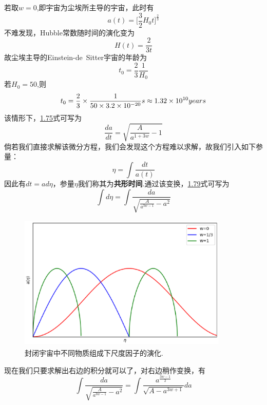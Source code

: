 \documentclass[a4paper]{book}
\begin{document}
若取$w=0$,即宇宙为尘埃所主导的宇宙，此时有
\begin{equation}
	a(t)=\Big[\frac{3}{2}H_0t\Big]^{\frac{2}{3}}
\end{equation} 
不难发现，Hubble常数随时间的演化变为
\begin{equation}
	H(t)=\frac{2}{3t}
\end{equation}
故尘埃主导的Einstein-de~Sitter宇宙的年龄为
\begin{equation}
	t_0=\frac{2}{3}\frac{1}{H_0}
\end{equation}
若$H_0=50$,则
\begin{equation}
	t_0=\frac{2}{3}\times\frac{1}{50\times3.2\times10^{-20}}s\approx1.32\times10^{10}years\notag
\end{equation}
该情形下，\hyperref[1.75]{1.75}式可写为
\begin{equation}\label{1.79}
	\frac{da}{dt}=\sqrt{\frac{A}{a^{1+3w}}-1}
\end{equation}
倘若我们直接求解该微分方程，我们会发现这个方程难以求解，故我们引入如下参量：
\begin{equation}
	\eta =\int\frac{dt}{a(t)}
\end{equation}
因此有$dt=ad\eta$，参量$\eta$我们称其为\textbf{共形时间}.通过该变换，\hyperref[1.79]{1.79}式可写为
\begin{equation}
	\int d\eta=\int\frac{da}{\sqrt{\frac{A}{a^{3w-1}}-a^2}}
\end{equation}
\begin{figure}[!h]
	\centering
	\includegraphics[width=10cm,height=6.5cm]{figures/k=1.eps}
	\caption{封闭宇宙中不同物质组成下尺度因子的演化.}
\end{figure}
现在我们只要求解出右边的积分就可以了，对右边稍作变换，有
\begin{equation}
\int\frac{da}{\sqrt{\frac{A}{a^{3w-1}}-a^2}}=\int\frac{	a^{\frac{3w-1}{2}}}{\sqrt{A-a^{3w+1}}}da
\end{equation}
\end{document}
